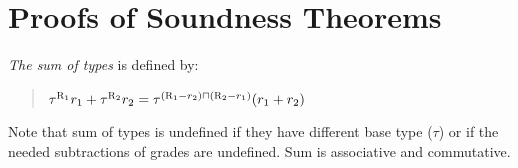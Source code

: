 
\section{ Proofs of Soundness Theorems}

{\em The sum of types} is defined by:
\begin{quote}
$\tau^{\textsc{R}_1}{r_1}+\tau^{\textsc{R}_2}{r_2}=\tau^{(\textsc{R}_1 - r_2) \sqcap (\textsc{R}_2 - r_1)}{(r_1+r_2)}$ 
\end{quote}
Note that sum of types is undefined if they have different base type ($\tau$) or if the needed subtractions of grades are undefined. Sum is associative and commutative. 

